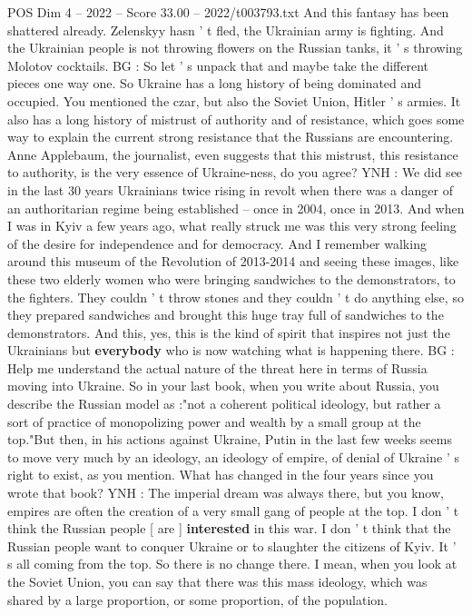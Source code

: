 \begin{textsample}{POS Dim 4 – 2022 – Score 33.00 – 2022/t003793.txt}
And this fantasy has been shattered already.
Zelenskyy hasn ' t fled, the Ukrainian army is fighting.
And the Ukrainian people is not throwing flowers on the Russian tanks, it ' s throwing Molotov cocktails.
BG : So let ' s unpack that and maybe take the different pieces one way one.
So Ukraine has a long history of being dominated and occupied.
You mentioned the czar, but also the Soviet Union, Hitler ' s armies.
It also has a long history of mistrust of authority and of resistance, which goes some way to explain the current strong resistance that the Russians are encountering.
Anne Applebaum, the journalist, even suggests that this mistrust, this resistance to authority, is the very essence of Ukraine-ness, do you agree?
YNH : We did see in the last 30 years Ukrainians twice rising in revolt when there was a danger of an authoritarian regime being established -- once in 2004, once in 2013.
And when I was in Kyiv a few years ago, what really struck me was this very strong feeling of the desire for independence and for democracy.
And I remember walking around this museum of the Revolution of 2013-2014 and seeing these images, like these two elderly women who were bringing sandwiches to the demonstrators, to the fighters.
They couldn ' t throw stones and they couldn ' t do anything else, so they prepared sandwiches and brought this huge tray full of sandwiches to the demonstrators.
And this, yes, this is the kind of spirit that inspires not just the Ukrainians but \textbf{everybody} who is now watching what is happening there.
BG : Help me understand the actual nature of the threat here in terms of Russia moving into Ukraine.
So in your last book, when you write about Russia, you describe the Russian model as :"not a coherent political ideology, but rather a sort of practice of monopolizing power and wealth by a small group at the top."But then, in his actions against Ukraine, Putin in the last few weeks seems to move very much by an ideology, an ideology of empire, of denial of Ukraine ' s right to exist, as you mention.
What has changed in the four years since you wrote that book?
YNH : The imperial dream was always there, but you know, empires are often the creation of a very small gang of people at the top.
I don ' t think the Russian people [ are ] \textbf{interested} in this war.
I don ' t think that the Russian people want to conquer Ukraine or to slaughter the citizens of Kyiv.
It ' s all coming from the top.
So there is no change there.
I mean, when you look at the Soviet Union, you can say that there was this mass ideology, which was shared by a large proportion, or some proportion, of the population.

\end{textsample}
